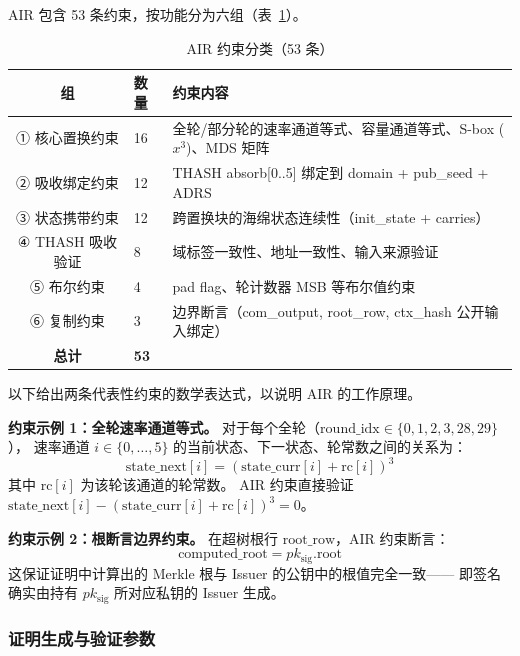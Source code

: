 \documentclass[11pt,a4paper]{ctexart}
\begin{document}
AIR 包含 53 条约束，按功能分为六组（表~\ref{tab:constraints}）。

\begin{table}[h]
\centering
\caption{AIR 约束分类（53 条）}
\label{tab:constraints}
\begin{tabular}{@{}cll@{}}
\toprule
\textbf{组} & \textbf{数量} & \textbf{约束内容} \\
\midrule
① 核心置换约束   & 16 & 全轮/部分轮的速率通道等式、容量通道等式、S-box ($x^3$)、MDS 矩阵 \\
② 吸收绑定约束   & 12 & THASH absorb[0..5] 绑定到 domain + pub\_seed + ADRS \\
③ 状态携带约束   & 12 & 跨置换块的海绵状态连续性（init\_state + carries） \\
④ THASH 吸收验证 & 8  & 域标签一致性、地址一致性、输入来源验证 \\
⑤ 布尔约束       & 4  & pad flag、轮计数器 MSB 等布尔值约束 \\
⑥ 复制约束       & 3  & 边界断言（com\_output, root\_row, ctx\_hash 公开输入绑定） \\
\midrule
\textbf{总计}     & \textbf{53} & \\
\bottomrule
\end{tabular}
\end{table}

以下给出两条代表性约束的数学表达式，以说明 AIR 的工作原理。

\textbf{约束示例 1：全轮速率通道等式。}
对于每个全轮（$\mathrm{round\_idx} \in \{0,1,2,3,28,29\}$），
速率通道 $i \in \{0,\ldots,5\}$ 的当前状态、下一状态、轮常数之间的关系为：
\begin{equation}
  \mathrm{state\_next}[i] = \left(\mathrm{state\_curr}[i] + \mathrm{rc}[i]\right)^3
\end{equation}
其中 $\mathrm{rc}[i]$ 为该轮该通道的轮常数。
AIR 约束直接验证 $\mathrm{state\_next}[i] - \left(\mathrm{state\_curr}[i] + \mathrm{rc}[i]\right)^3 = 0$。

\textbf{约束示例 2：根断言边界约束。}
在超树根行 $\mathrm{root\_row}$，AIR 约束断言：
\begin{equation}
  \mathrm{computed\_root} = pk_{\mathrm{sig}}.\mathrm{root}
\end{equation}
这保证证明中计算出的 Merkle 根与 Issuer 的公钥中的根值完全一致——
即签名确实由持有 $pk_{\mathrm{sig}}$ 所对应私钥的 Issuer 生成。


\subsubsection{证明生成与验证参数}
\end{document}
